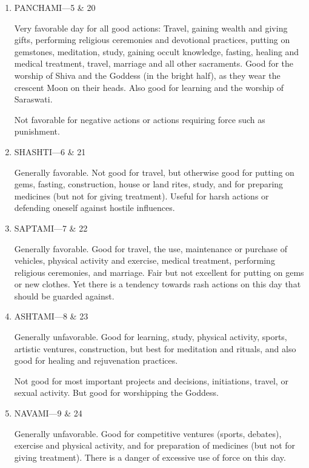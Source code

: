 \begin{enumerate}
 

\item[ ] PANCHAMI—5 \& 20

Very favorable day for all good actions: Travel, gaining wealth and giving gifts, performing religious ceremonies and devotional practices, putting on gemstones, meditation, study, gaining occult knowledge, fasting, healing and medical treatment, travel, marriage and all other sacraments. Good for the worship of Shiva and the Goddess (in the bright half), as they wear the crescent Moon on their heads. Also good for learning and the worship of Saraswati.

Not favorable for negative actions or actions requiring force such as punishment.

 

\item[ ] SHASHTI—6 \& 21

Generally favorable. Not good for travel, but otherwise good for putting on gems, fasting, construction, house or land rites, study, and for preparing medicines (but not for giving treatment). Useful for harsh actions or defending oneself against hostile influences.

 

\item[ ] SAPTAMI—7 \& 22

Generally favorable. Good for travel, the use, maintenance or purchase of vehicles, physical activity and exercise, medical treatment, performing religious ceremonies, and marriage. Fair but not excellent for putting on gems or new clothes. Yet there is a tendency towards rash actions on this day that should be guarded against.

 

\item[ ] ASHTAMI—8 \& 23

Generally unfavorable. Good for learning, study, physical activity, sports, artistic ventures, construction, but best for meditation and rituals, and also good for healing and rejuvenation practices.

Not good for most important projects and decisions, initiations, travel, or sexual activity. But good for worshipping the Goddess.

 

\item[ ] NAVAMI—9 \& 24

Generally unfavorable. Good for competitive ventures (sports, debates), exercise and physical activity, and for preparation of medicines (but not for giving treatment). There is a danger of excessive use of force on this day.


\end{enumerate}
